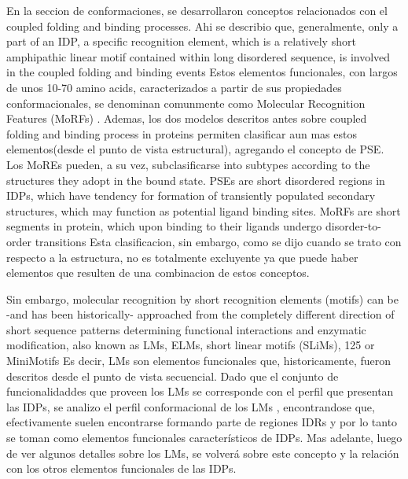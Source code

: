 En la seccion de conformaciones, se desarrollaron conceptos relacionados con el coupled folding and binding processes.
Ahi se describio que, generalmente, only a part of an IDP, a specific recognition element, which is a relatively short amphipathic linear motif contained within long disordered sequence, is involved in the coupled folding and binding events
Estos elementos funcionales, con largos de unos 10-70 amino acids, caracterizados a partir de sus propiedades conformacionales,  se denominan comunmente como Molecular Recognition Features (MoRFs)
\cite{mohan2006analysis,vacic2007characterization,oldfield2005coupled}.
Ademas, los dos modelos descritos antes sobre coupled folding and binding process in proteins permiten clasificar aun mas estos elementos(desde el punto de vista estructural), agregando el concepto de 
PSE\cite{fuxreiter2004preformed}. Los MoREs pueden, a su vez, subclasificarse into subtypes according to the structures they adopt in the bound state.
PSEs are short disordered regions in IDPs, which have tendency for formation of transiently populated secondary structures, which may function as potential ligand binding sites. 
MoRFs are short segments in protein, which upon binding to their ligands undergo disorder-to-order transitions
Esta clasificacion, sin embargo, como se dijo cuando se trato con respecto a la estructura, no es totalmente excluyente ya que puede haber elementos que resulten de una combinacion de estos conceptos.


Sin embargo, molecular recognition by short recognition elements (motifs) can be -and has been historically- approached from the completely different direction of short sequence patterns determining functional interactions and enzymatic modification,
also known as LMs, ELMs, short linear motifs (SLiMs), 125 or MiniMotifs  \cite{davey2012attributes}
Es decir, LMs son elementos funcionales que, historicamente, fueron descritos desde el punto de vista secuencial. 
Dado que el conjunto de funcionalidaddes que proveen los LMs se corresponde con el perfil que presentan las IDPs, se analizo el perfil conformacional de los LMs \cite{fuxreiter2007local}, encontrandose que, efectivamente
suelen encontrarse formando parte de regiones IDRs y por lo tanto se toman como elementos funcionales característicos de IDPs.
Mas adelante, luego de ver algunos detalles sobre los LMs, se volverá sobre este concepto y la relación con los otros elementos funcionales de las IDPs.

